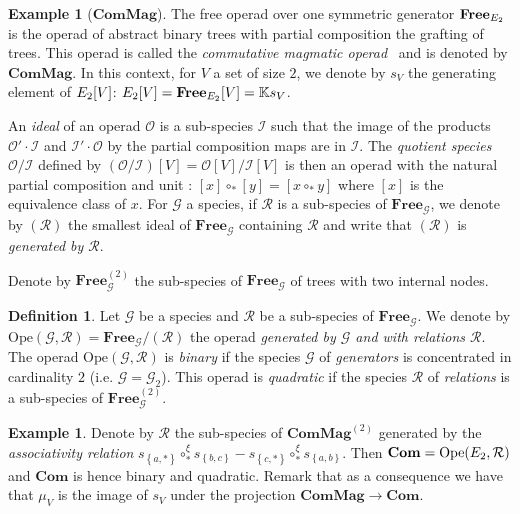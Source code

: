 \documentclass[11pt]{article}
\theoremstyle{definition}
\newtheorem{defi}[theo]{Definition}
\newtheorem{exam}[theo]{Example}
\numberwithin{equation}{section}
\newcommand{\set}[1]{\left\{#1\right\}}
\newcommand{\spe}[1]{\normalfont{\textsc{#1}}}
\newcommand{\op}[1]{\mathbf{#1}}
\newcommand{\iso}[1]{\left[#1\right]}
\newcommand{\K}{\mathbb{K}}
\newcommand{\comp}[1][\ast]{\circ_{#1}}
\newcommand{\Sym}{\spe{E}}
\newcommand{\Operad}{\mathcal{O}}
\newcommand{\Com}{\op{Com}}
\newcommand{\ComMag}{\op{ComMag}}
\newcommand{\free}[1]{\op{Free}_{#1}}
\newcommand{\Ope}{\mathrm{Ope}}
\begin{document}
\begin{exam}[$\ComMag$]
    The free operad over one symmetric generator $\free{\Sym_2}$ is the operad of abstract binary trees
    with partial composition the grafting of trees. This operad is called the {\em commutative magmatic 
    operad}~\cite{BL11} and is denoted by $\ComMag$. In this context, for $V$ a set of size $2$, we denote 
    by $s_V$ the generating element of $\Sym_2[V]$: $\Sym_2[V]=\free{\Sym_2}[V] = \K s_V$.
\end{exam}

An {\em ideal} of an operad $\Operad$ is a sub-species $\mathcal{I}$ such that the image of the products
$\Operad'\cdot \mathcal{I}$ and $\mathcal{I}'\cdot\Operad$ by the partial composition maps are in 
$\mathcal{I}$. The {\em quotient species} $\Operad/ \mathcal{I}$ defined by 
$(\Operad/\mathcal{I})[V] = \Operad[V]/\mathcal{I}[V]$ is then an operad with the natural partial 
composition and unit : $\iso{x}\comp\iso{y}=\iso{x\comp y}$ where $\iso{x}$ is the equivalence class of 
$x$. For $\mathcal{G}$ a species, if $\mathcal{R}$ is a sub-species of $\free{\mathcal{G}}$, we denote 
by $(\mathcal{R})$ the smallest ideal of $\free{\mathcal{G}}$ containing $\mathcal{R}$ and write that 
$(\mathcal{R})$ is {\em generated by $\mathcal{R}$}.

Denote by $\free{\mathcal{G}}^{(2)}$ the sub-species of $\free{\mathcal{G}}$ of trees with two internal nodes.

\begin{defi}
    Let $\mathcal{G}$ be a species and $\mathcal{R}$ be a sub-species of $\free{\mathcal{G}}$. We denote by 
    $\Ope(\mathcal{G},\mathcal{R})=\free{\mathcal{G}}/(\mathcal{R})$ the operad {\em generated by 
    $\mathcal{G}$ and with relations $\mathcal{R}$}. 
    The operad $\Ope(\mathcal{G},\mathcal{R})$ is {\em binary} if the species $\mathcal{G}$ of 
    {\em generators} is concentrated in cardinality $2$ (i.e. $\mathcal{G} = \mathcal{G}_2$). This operad 
    is {\em quadratic} if the species $\mathcal{R}$ of {\em relations} is a sub-species of 
    $\free{\mathcal{G}}^{(2)}$.
\end{defi}

\begin{exam}\label{ex_gen_com} 
    Denote by $\mathcal{R}$ the sub-species of $\ComMag^{(2)}$ generated by the {\em associativity relation}
    $s_{\set{a,\ast}}\comp^{\xi} s_{\set{b,c}} - s_{\set{c,\ast}}\comp^{\xi} s_{\set{a,b}}$. 
    Then $\Com=\Ope(\Sym_2,\mathcal{R})$ and $\Com$ is hence binary and quadratic. Remark that as a 
    consequence we have that $\mu_V$ is the image of $s_V$ under the projection $\ComMag\to\Com$.
\end{exam}
\end{document}
